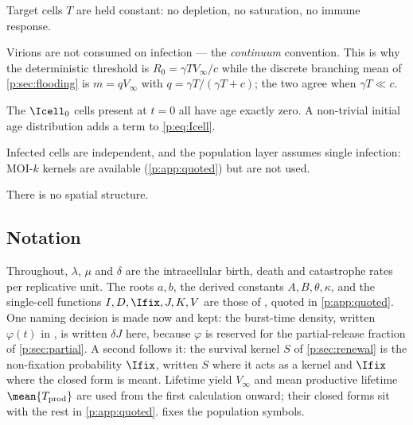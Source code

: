 \begin{description}[leftmargin=2.2em,style=sameline]
\item[(A1)] Target cells $T$ are held constant: no depletion, no
saturation, no immune response.
\item[(A2)] Virions are not consumed on infection --- the \emph{continuum}
convention. This is why the deterministic threshold is $R_0=\gamma
TV_\infty/c$ while the discrete branching mean of \cref{p:sec:flooding} is
$m=qV_\infty$ with $q=\gamma T/(\gamma T+c)$; the two agree when $\gamma
T\ll c$.
\item[(A3)] The $\Icell_0$ cells present at $t=0$ all have age exactly
zero. A non-trivial initial age distribution adds a term to
\cref{p:eq:Icell}.
\item[(A4)] Infected cells are independent, and the population layer
assumes single infection: MOI-$k$ kernels are available
(\cref{p:app:quoted}) but are not used.
\item[(A5)] There is no spatial structure.
\end{description}

\subsection{Notation}
\label{p:sec:quoted-results}

Throughout, $\lambda$, $\mu$ and $\delta$ are the intracellular birth,
death and catastrophe rates per replicative unit. The roots $a,b$, the
derived constants $A,B,\theta,\kappa$, and the single-cell functions
$I,D,\Ifix,J,K,V$ are those of \ChCore{}, quoted in \cref{p:app:quoted}.
One naming decision is made now and kept: the burst-time density, written
$\varphi(t)$ in \ChDist{}, is written $\delta J$ here, because $\varphi$ is
reserved for the partial-release fraction of \cref{p:sec:partial}. A second
follows it: the survival kernel $S$ of \cref{p:sec:renewal} is the
non-fixation probability $\Ifix$, written $S$ where it acts as a kernel and
$\Ifix$ where the closed form is meant. Lifetime yield $V_\infty$ and mean
productive lifetime $\mean{T_{\rm prod}}$ are used from the first
calculation onward; their closed forms sit with the rest in
\cref{p:app:quoted}.  fixes the population symbols.

